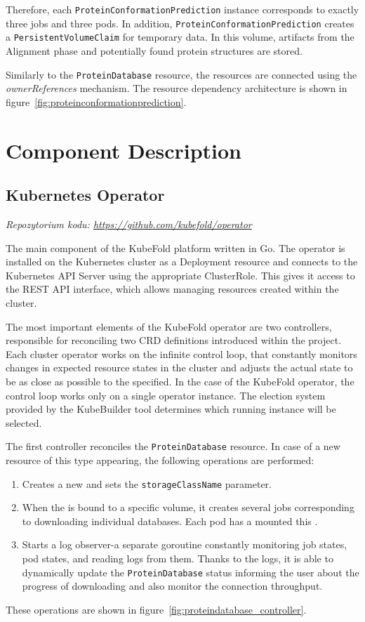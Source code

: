 Therefore, each \texttt{ProteinConformationPrediction} instance corresponds to exactly three jobs and three pods.
In addition, \texttt{ProteinConformationPrediction} creates a \texttt{PersistentVolumeClaim} for temporary data.
In this volume, artifacts from the Alignment phase and potentially found protein structures are stored.

Similarly to the \texttt{ProteinDatabase} resource, the resources are connected using the \textit{ownerReferences} mechanism.
The resource dependency architecture is shown in figure~\ref{fig:proteinconformationprediction}.


\section{Component Description}

\subsection{Kubernetes Operator}\label{subsec:component-operator}
\textit{Repozytorium kodu: \url{https://github.com/kubefold/operator}}

The main component of the KubeFold platform written in Go.
The operator is installed on the Kubernetes cluster as a Deployment resource and connects to the Kubernetes API Server using the appropriate ClusterRole.
This gives it access to the REST API interface, which allows managing resources created within the cluster.

The most important elements of the KubeFold operator are two controllers, responsible for reconciling two CRD definitions introduced within the project.
Each cluster operator works on the infinite control loop, that constantly monitors changes in expected resource states in the cluster and adjusts the actual state to be as close as possible to the specified.
In the case of the KubeFold operator, the control loop works only on a single operator instance.
The election system provided by the KubeBuilder tool determines which running instance will be selected.

The first controller reconciles the \texttt{ProteinDatabase} resource.
In case of a new resource of this type appearing, the following operations are performed:
\begin{enumerate}
    \item Creates a new  and sets the \texttt{storageClassName} parameter.
    \item When the  is bound to a specific volume, it creates several jobs corresponding to downloading individual databases.
    Each pod has a mounted this .
    \item Starts a log observer-a separate goroutine constantly monitoring job states, pod states, and reading logs from them.
    Thanks to the logs, it is able to dynamically update the \texttt{ProteinDatabase} status informing the user about the progress of downloading and also monitor the connection throughput.
\end{enumerate}
These operations are shown in figure~\ref{fig:proteindatabase_controller}.


